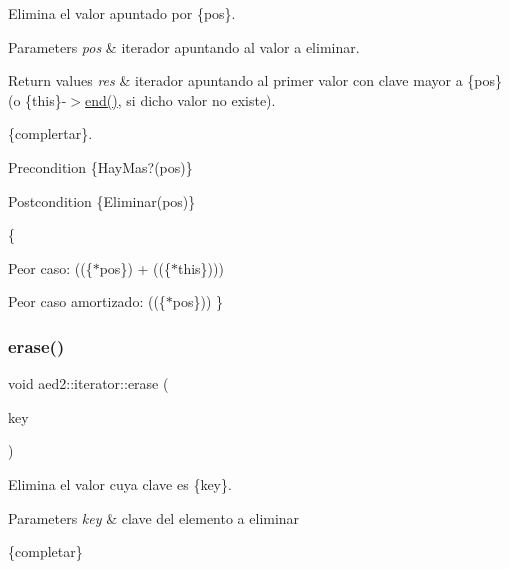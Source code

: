 Elimina el valor apuntado por \{pos\}. 


\begin{DoxyParams}{Parameters}
{\em pos} & iterador apuntando al valor a eliminar. \\
\hline
\end{DoxyParams}

\begin{DoxyRetVals}{Return values}
{\em res} & iterador apuntando al primer valor con clave mayor a \{pos\} (o \{this\}-\/$>$\hyperlink{classaed2_1_1iterator_a67caf9468be999e9be96b7add5d79946}{end()}, si dicho valor no existe).\\
\hline
\end{DoxyRetVals}
\{complertar\}.

\begin{DoxyPrecond}{Precondition}
\{Hay\+Mas?(pos)\} 
\end{DoxyPrecond}
\begin{DoxyPostcond}{Postcondition}
\{Eliminar(pos)\}
\end{DoxyPostcond}
\{
\begin{DoxyItemize}
\item Peor caso\+: ((\{$\ast$pos\}) + ((\{$\ast$this\})))
\item Peor caso amortizado\+: ((\{$\ast$pos\})) \} 
\end{DoxyItemize}\mbox{\label{classaed2_1_1iterator_a0a0e62b2a2c0fb98f431164c66a6e388}} 
\subsubsection{\texorpdfstring{erase()}{erase()}\hspace{0.1cm}{\footnotesize\ttfamily [2/2]}}
{\footnotesize\ttfamily void aed2\+::iterator\+::erase (\begin{DoxyParamCaption}\item[{const Key \&}]{key }\end{DoxyParamCaption})\hspace{0.3cm}{\ttfamily [inline]}}



Elimina el valor cuya clave es \{key\}. 


\begin{DoxyParams}{Parameters}
{\em key} & clave del elemento a eliminar\\
\hline
\end{DoxyParams}
\{completar\}

